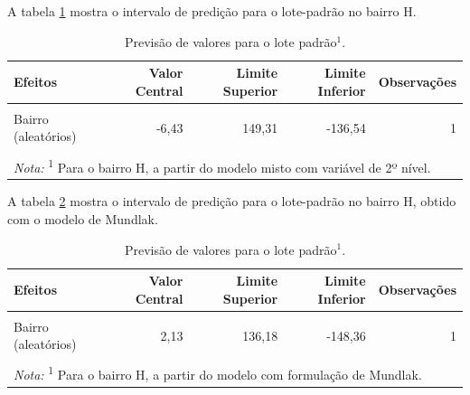 \documentclass[
  a4paper, 11pt]{article}
\begin{document}
A tabela \ref{tab:pred2} mostra o intervalo de predição para o
lote-padrão no bairro H.

\begin{table}[H]

\caption{\label{tab:pred2}Previsão de valores para o lote padrão$^1$.}
\centering
\begin{tabular}[t]{lrrrr}
\toprule
Efeitos & Valor Central & Limite Superior & Limite Inferior & Observações\\
\midrule
\cellcolor{gray!6}{Combinados} & \cellcolor{gray!6}{5.728,10} & \cellcolor{gray!6}{5.910,12} & \cellcolor{gray!6}{5.542,45} & \cellcolor{gray!6}{1}\\
Bairro (aleatórios) & -6,43 & 149,31 & -136,54 & 1\\
\cellcolor{gray!6}{Fixos} & \cellcolor{gray!6}{5.725,28} & \cellcolor{gray!6}{5.910,05} & \cellcolor{gray!6}{5.549,70} & \cellcolor{gray!6}{1}\\
\bottomrule
\multicolumn{5}{l}{\rule{0pt}{1em}\textit{Nota: } \textsuperscript{1} Para o bairro H, a partir do modelo misto com variável de 2º nível.}\\
\end{tabular}
\end{table}

A tabela \ref{tab:pred3} mostra o intervalo de predição para o
lote-padrão no bairro H, obtido com o modelo de Mundlak.

\begin{table}[H]

\caption{\label{tab:pred3}Previsão de valores para o lote padrão$^1$.}
\centering
\begin{tabular}[t]{lrrrr}
\toprule
Efeitos & Valor Central & Limite Superior & Limite Inferior & Observações\\
\midrule
\cellcolor{gray!6}{Combinados} & \cellcolor{gray!6}{5.713,74} & \cellcolor{gray!6}{5.866,18} & \cellcolor{gray!6}{5.562,96} & \cellcolor{gray!6}{1}\\
Bairro (aleatórios) & 2,13 & 136,18 & -148,36 & 1\\
\cellcolor{gray!6}{Fixos} & \cellcolor{gray!6}{5.714,68} & \cellcolor{gray!6}{5.866,14} & \cellcolor{gray!6}{5.564,00} & \cellcolor{gray!6}{1}\\
\bottomrule
\multicolumn{5}{l}{\rule{0pt}{1em}\textit{Nota: } \textsuperscript{1} Para o bairro H, a partir do modelo com formulação de Mundlak.}\\
\end{tabular}
\end{table}
\end{document}
